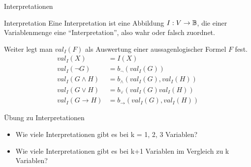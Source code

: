 \begin{frame}{Interpretationen}
	\begin{block}{Interpretation}
		\pause Eine Interpretation ist eine Abbildung $I : V \rightarrow \mathbb{B}$\pause , die einer Variablenmenge eine ``Interpretation''\pause , also wahr oder falsch zuordnet.
	\end{block}

\pause Weiter legt man $val_I(F)$ als Auswertung einer aussagenlogischer Formel $F$ fest.
\pause
	\newcommand{\val}{val}
	\begin{align*}
	\val_I(X)         &= I(X) \\
	\val_I(\lnot G)   &= b_{\lnot}(\val_I(G)) \\
	\val_I(G \land H) &= b_{\land}(\val_I(G), \val_I(H)) \\
	\val_I(G \lor H)  &= b_{\lor}(\val_I(G)  \val_I(H)) \\
	\val_I(G \rightarrow H)&= b_{\rightarrow}(\val_I(G), \val_I(H))
	\end{align*}
\end{frame}

\begin{frame}{Übung zu Interpretationen}
	
	
	\begin{itemize}
		\item Wie viele Interpretationen gibt es bei k = 1, 2, 3 Variablen?
		\item Wie viele Interpretationen gibt es bei k+1 Variablen im Vergleich zu k Variablen?
	\end{itemize}
	
\end{frame}	


